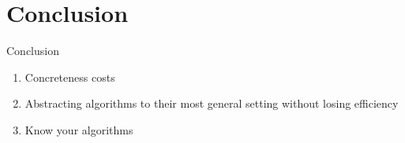 \documentclass[10pt]{beamer}
\begin{document}
\section{Conclusion}

\begin{frame}{Conclusion}
  \begin{enumerate}
    \item Concreteness costs
    \item Abstracting algorithms to their most general setting without losing efficiency
    \item Know your algorithms
  \end{enumerate}
\end{frame}
\end{document}
